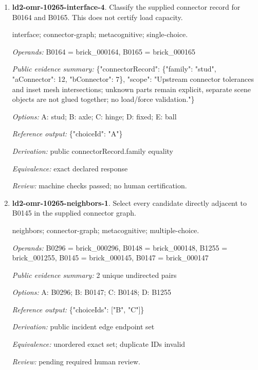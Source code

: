 \begin{enumerate}
\par{\small interface; connector-graph; metacognitive; single-choice.\par\textit{Operands:} B0064 = brick\_000064, B0065 = brick\_000065\par\textit{Public evidence summary:} \{"connectorRecord": \{"family": "hinge", "aConnector": 1, "bConnector": 2\}, "scope": "Upstream connector tolerances and inset mesh intersections; unknown parts remain explicit, separate scene objects are not glued together; no load/force validation."\}\par\textit{Options:} A: ball; B: hinge; C: axle; D: stud; E: fixed\par\textit{Reference output:} \{"choiceId": "B"\}\par\textit{Derivation:} public connectorRecord.family equality\par\textit{Equivalence:} exact declared response\par\textit{Review:} machine checks passed; no human certification.}
\item \textbf{ld2-omr-10265-interface-4}. Classify the supplied connector record for B0164 and B0165. This does not certify load capacity.
\par{\small interface; connector-graph; metacognitive; single-choice.\par\textit{Operands:} B0164 = brick\_000164, B0165 = brick\_000165\par\textit{Public evidence summary:} \{"connectorRecord": \{"family": "stud", "aConnector": 12, "bConnector": 7\}, "scope": "Upstream connector tolerances and inset mesh intersections; unknown parts remain explicit, separate scene objects are not glued together; no load/force validation."\}\par\textit{Options:} A: stud; B: axle; C: hinge; D: fixed; E: ball\par\textit{Reference output:} \{"choiceId": "A"\}\par\textit{Derivation:} public connectorRecord.family equality\par\textit{Equivalence:} exact declared response\par\textit{Review:} machine checks passed; no human certification.}
\item \textbf{ld2-omr-10265-neighbors-1}. Select every candidate directly adjacent to B0145 in the supplied connector graph.
\par{\small neighbors; connector-graph; metacognitive; multiple-choice.\par\textit{Operands:} B0296 = brick\_000296, B0148 = brick\_000148, B1255 = brick\_001255, B0145 = brick\_000145, B0147 = brick\_000147\par\textit{Public evidence summary:} 2 unique undirected pairs\par\textit{Options:} A: B0296; B: B0147; C: B0148; D: B1255\par\textit{Reference output:} \{"choiceIds": ["B", "C"]\}\par\textit{Derivation:} public incident edge endpoint set\par\textit{Equivalence:} unordered exact set; duplicate IDs invalid\par\textit{Review:} pending required human review.}

\end{enumerate}
